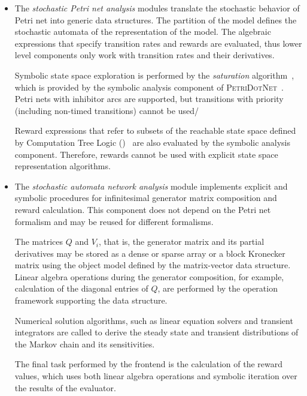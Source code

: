 \begin{itemize}
\item The \emph{stochastic Petri net analysis} modules translate the
  stochastic behavior of Petri net into generic data structures. The
  partition of the model defines the stochastic automata of the
   representation of the model. The algebraic expressions
  that specify transition rates and rewards are evaluated, thus lower
  level components only work with transition rates and their
  derivatives.

  Symbolic state space exploration is performed by the
  \emph{saturation} algorithm~\citep{ciardo2001saturation}, which is
  provided by the symbolic analysis component of
  \textsc{PetriDotNet}~\citep{TDK2010_Darvas}. Petri nets with
  inhibitor arcs are supported, but transitions with priority
  (including non-timed transitions) cannot be used/

  Reward expressions that refer to subsets of the reachable state space
  defined by Computation Tree Logic
  ()~\citep{DBLP:journals/fac/HanssonJ94} are also
  evaluated by the symbolic analysis component. Therefore,
   rewards cannot be used with explicit state space
  representation algorithms.

\item The \emph{stochastic automata network analysis} module
  implements explicit and symbolic procedures for infinitesimal
  generator matrix composition and reward calculation. This component
  does not depend on the Petri net formalism and may be reused for
  different formalisms.

  The matrices $Q$ and $V_i$, that is, the generator matrix and its
  partial derivatives may be stored as a dense or sparse array or a
  block Kronecker matrix using the object model defined by the
  matrix-vector data structure. Linear algebra operations during the
  generator composition, for example, calculation of the diagonal
  entries of $Q$, are performed by the operation framework supporting
  the data structure.

  Numerical solution algorithms, such as linear equation solvers and
  transient integrators are called to derive the steady state and
  transient distributions of the Markov chain and its sensitivities.

  The final task performed by the frontend is the calculation of the
  reward values, which uses both linear algebra operations and
  symbolic iteration over the results of the  evaluator.
\end{itemize}
